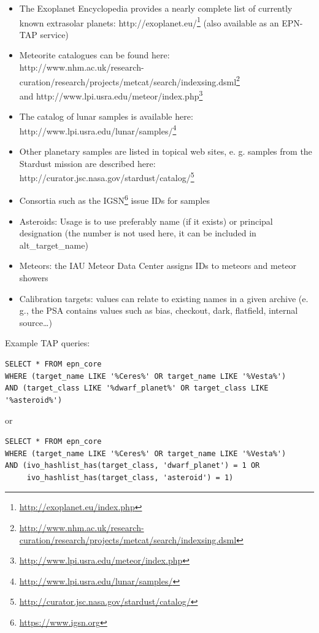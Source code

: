 \documentclass[11pt,a4paper]{ivoa}
\begin{document}
\begin{itemize}
\item The Exoplanet Encyclopedia provides a nearly complete list of currently known extrasolar planets: http://exoplanet.eu/\footnote{\url{http://exoplanet.eu/index.php}} (also available as an EPN-TAP service)
\item Meteorite catalogues can be found here: \\http://www.nhm.ac.uk/research-curation/research/projects/metcat/search/indexsing.dsml\footnote{\url{http://www.nhm.ac.uk/research-curation/research/projects/metcat/search/indexsing.dsml}} \\and http://www.lpi.usra.edu/meteor/index.php\footnote{\url{http://www.lpi.usra.edu/meteor/index.php}}
\item The catalog of lunar samples is available here: http://www.lpi.usra.edu/lunar/samples/\footnote{\url{http://www.lpi.usra.edu/lunar/samples/}}
\item Other planetary samples are listed in topical web sites, e. g. samples from the Stardust mission are described here: \\http://curator.jsc.nasa.gov/stardust/catalog/\footnote{\url{http://curator.jsc.nasa.gov/stardust/catalog/}}
\item Consortia such as the IGSN\footnote{\url{https://www.igsn.org}} issue IDs for samples
\item Asteroids: Usage is to use preferably name (if it exists) or principal designation (the number is not used here, it can be included in alt\_target\_name)\\
\item Meteors: the IAU Meteor Data Center assigns IDs to meteors and meteor showers
\item Calibration targets: values can relate to existing names in a given archive (e. g., the PSA contains values such as bias, checkout, dark, flatfield, internal source…)
\end{itemize}

Example TAP queries:

\begin{verbatim}
SELECT * FROM epn_core 
WHERE (target_name LIKE '%Ceres%' OR target_name LIKE '%Vesta%')
AND (target_class LIKE '%dwarf_planet%' OR target_class LIKE '%asteroid%')
\end{verbatim}

or 

\begin{verbatim}
SELECT * FROM epn_core 
WHERE (target_name LIKE '%Ceres%' OR target_name LIKE '%Vesta%')
AND (ivo_hashlist_has(target_class, 'dwarf_planet') = 1 OR
     ivo_hashlist_has(target_class, 'asteroid') = 1)
\end{verbatim}
\end{document}
